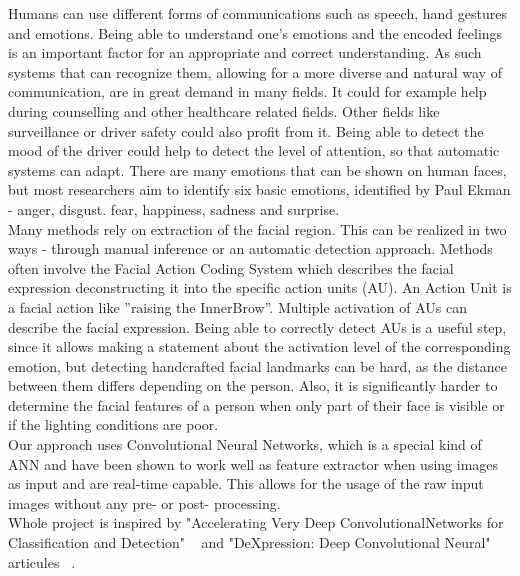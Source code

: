 Humans can use different forms of communications such as speech, hand gestures and emotions. Being able to understand one’s emotions and the encoded feelings is an important factor for an appropriate and correct understanding. As such systems that can recognize them, allowing for a more diverse and natural way of communication, are in great demand in many fields. It could for example help during counselling and other healthcare related fields. Other fields like surveillance or driver safety could also profit from it. Being able to detect the mood of the driver could help to detect the level of attention, so that automatic systems can adapt. There are many emotions that can be shown on human faces, but most researchers aim to identify six basic emotions, identified by Paul Ekman - anger, disgust. fear, happiness, sadness and surprise.\\

Many methods rely on extraction of the facial region. This can be realized in two ways - through manual inference or an automatic detection approach. Methods often involve the Facial Action Coding System which describes the facial expression deconstructing it into the specific action units (AU). An Action Unit is a facial action like ”raising the InnerBrow”. Multiple activation of AUs can describe the facial expression. Being able to correctly detect AUs is a useful step, since it allows making a statement about the activation level of the corresponding emotion, but detecting handcrafted facial landmarks can be hard, as the distance between them differs depending on the person. Also, it is significantly harder to determine the facial features of a person when only part of their face is visible or if the lighting conditions are poor.\\

Our approach uses Convolutional Neural Networks, which is a special kind of ANN and have been shown to work well as feature extractor when using images as input and are real-time capable. This allows for the usage of the raw input images without any pre- or post- processing.\\

Whole project is inspired by
"Accelerating Very Deep ConvolutionalNetworks for Classification and Detection"
~\cite{vdcnflsir}
and
"DeXpression: Deep Convolutional Neural" articules ~\cite{dcnnfer}.